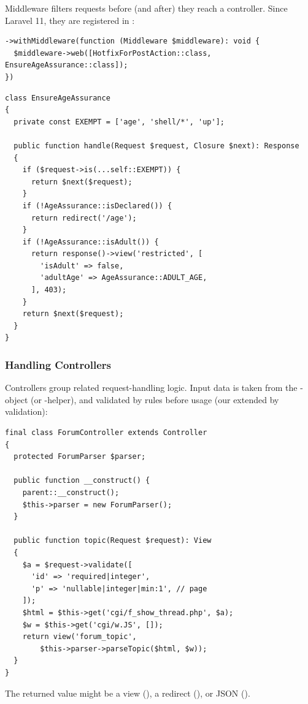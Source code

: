 \noindent Middleware filters requests before (and after) they reach a controller. Since Laravel
11, they are registered in :

\begin{lstlisting}
->withMiddleware(function (Middleware $middleware): void {
  $middleware->web([HotfixForPostAction::class, EnsureAgeAssurance::class]);
})
\end{lstlisting}

\begin{lstlisting}
class EnsureAgeAssurance
{
  private const EXEMPT = ['age', 'shell/*', 'up'];

  public function handle(Request $request, Closure $next): Response
  {
    if ($request->is(...self::EXEMPT)) {
      return $next($request);
    }
    if (!AgeAssurance::isDeclared()) {
      return redirect('/age');
    }
    if (!AgeAssurance::isAdult()) {
      return response()->view('restricted', [
        'isAdult' => false,
        'adultAge' => AgeAssurance::ADULT_AGE,
      ], 403);
    }
    return $next($request);
  }
}
\end{lstlisting}


\subsubsection{Handling Controllers}

Controllers group related request-handling logic. Input data is taken from the
-object (or -helper), and validated by rules before usage (our
 extended by validation):

\begin{lstlisting}
final class ForumController extends Controller
{
  protected ForumParser $parser;

  public function __construct() {
    parent::__construct();
    $this->parser = new ForumParser();
  }

  public function topic(Request $request): View
  {
    $a = $request->validate([
      'id' => 'required|integer',
      'p' => 'nullable|integer|min:1', // page
    ]);
    $html = $this->get('cgi/f_show_thread.php', $a);
    $w = $this->get('cgi/w.JS', []);
    return view('forum_topic',
        $this->parser->parseTopic($html, $w));
  }
}
\end{lstlisting}

\noindent The returned value might be a view (),
a redirect (), or JSON ().

